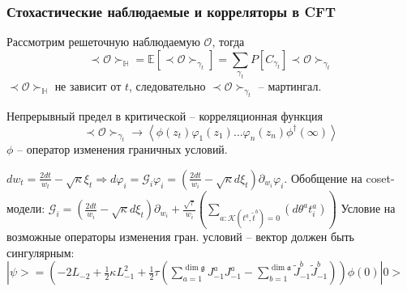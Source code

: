 \documentclass[pdftex]{beamer}
\newcommand{\gf}{\mathfrak{g}}
\newcommand{\af}{\mathfrak{a}}
\theoremstyle{definition} \newtheorem{Def}{Определение}
\begin{document}
\begin{frame}
  \frametitle{Стохастические наблюдаемые и корреляторы в CFT}

\vspace{-0.2cm}
  Рассмотрим решеточную наблюдаемую $\mathcal{O}$, тогда
  \begin{equation*}
    \prec \mathcal{O} \succ_{\mathbb{H}}=\mathbb{E}\left[\prec\mathcal{O}\succ_{\gamma_{t}}\right]=\sum_{\gamma_{t}} P\left[C_{\gamma_{t}}\right] \prec \mathcal{O} \succ_{\gamma_{t}}
  \end{equation*}
  $\prec \mathcal{O} \succ_{\mathbb{H}}$ не зависит от $t$, следовательно $\prec\mathcal{O}\succ_{\gamma_{t}}$ -- мартингал.

  Непрерывный предел в критической -- корреляционная функция
  \begin{equation*}
    \prec \mathcal{O} \succ_{\gamma_{t}}\to \left< \phi(z_{t}) \varphi_{1}(z_{1}) \dots \varphi_{n}(z_{n}) \phi^{\dagger}(\infty)\right>
  \end{equation*}
   $\phi$ -- оператор изменения граничных условий.

  $d w _{t}= \frac{2dt}{w_{t} }-\sqrt{\kappa}\xi_{t} \Rightarrow d\varphi_{i} = \mathcal{G}_{i}\varphi_{i}= \left(\frac{2dt}{w_{i}}-\sqrt{\kappa} d\xi_{t}\right) \partial_{w_{i}} \varphi_{i}$.
  Обобщение на coset-модели:  $\mathcal{G}_{i}=\left(\frac{2dt}{w_{i}}-\sqrt{\kappa} d\xi_{t}\right) \partial_{w_{i}}+\frac{\sqrt{\tau}}{w_{i}}\left(\sum_{a:\mathcal{K}(t^{a},\tilde{t}^{b})=0}\left(d \theta ^{a} t^{a}_{i}\right)\right)$
  Условие на возможные операторы изменения гран. условий -- вектор должен быть сингулярным:
  $|\psi>=\left(-2L_{-2}+\frac{1}{2}\kappa L_{-1}^{2}+\frac{1}{2}\tau \left(\displaystyle{\sum_{a=1}^{\dim\gf}}J^{a}_{-1}J^{a}_{-1}-\displaystyle{\sum_{b=1}^{\dim\af}}\tilde{J}^{b}_{-1}\tilde{J}^{b}_{-1}\right)\right) \phi(0)|0>$


\end{frame}
\end{document}
